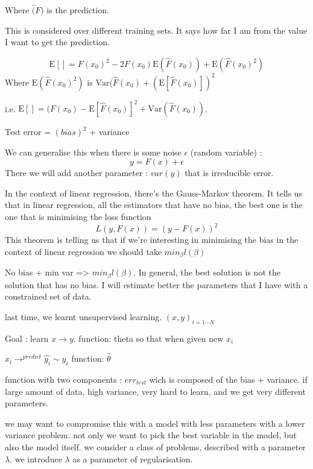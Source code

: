 \documentclass[a4paper]{tufte-book}
\newcommand{\E}{\mathrm{E}}
\newcommand{\var}{\mathrm{Var}}
\begin{document}
Where $\hat(F)$ is the prediction.

This is considered over different training sets. It says how far I am from the value I want to get the prediction.

\begin{equation}
\E[] = F(x_0)^2 - 2F(x_0) \E (\hat{F}(x_0)) + \E (\hat{F}(x_0)^2)
\end{equation}
Where $\E (\hat{F}(x_0)^2)$ is $\var(\hat{F}(x_0) + (\E[\hat{F}(x_0)])^2$

i.e. $\E[] = (F(x_0) - \E[\hat{F}(x_0)]^2 + \var(\hat{F}(x_0))$.

Test error = $(bias)^2$ + variance

We can generalise this when there is some noise $\epsilon$ (random variable) :
\begin{equation}
y = F(x) + \epsilon
\end{equation} 
There we will add another parameter : $var(y)$ that is irreducible error.

In the context of linear regression, there’s the Gauss-Markov theorem.
It tells us that in linear regression, all the estimators that have no bias, the best one is the one that is minimising the loss function
\begin{equation}
L(y,F(x)) = (y-F(x))^2
\end{equation}
This theorem is telling us that if we’re interesting in minimising the bias in the context of linear regression we should take $min_\beta l(\beta)$

No bias + min var => $min_\beta l(\beta)$.
In general, the best solution is not the solution that has no bias.
I will estimate better the parameters that I have with a constrained set of data.



last time, we learnt unsupervised learning.
$(x,y)_{i=1\cdots N}$

Goal : learn $x \rightarrow y$. function: theta
so that when given new $x_i$

$x_i \rightarrow^{predict} \hat{y_i} \sim y_i$
function: $\hat\theta$


function with two components : $err_{test}$ wich is composed of the bias +
variance.
if large amount of data, high variance, very hard to learn, and we get
very different parameters.

we may want to compromise this with a model with less parameters with 
a lower variance problem.
not only we want to pick the best variable in the model, but also the model
itself.
we consider a class of problems, described with a parameter $\lambda$.
we introduce $\lambda$ as a parameter of regularisation.
\end{document}
